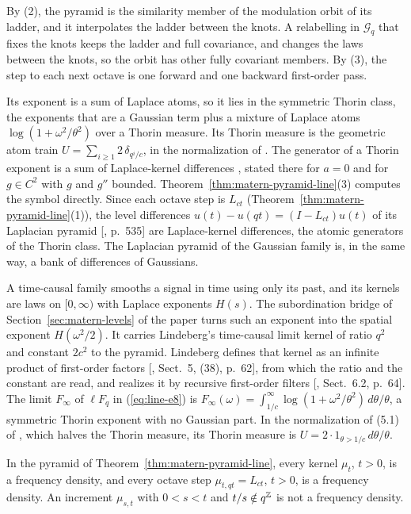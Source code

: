 By (2), the \Matern{} pyramid is the similarity member of the modulation orbit of its ladder, and
it interpolates the ladder between the knots. A relabelling in $\mathcal{G}_q$ that fixes the knots
keeps the ladder and full covariance, and changes the laws between the knots, so the orbit has other
fully covariant members. By (3), the step to each next octave is
one forward and one backward first-order pass.

Its exponent is a sum of Laplace atoms, so it lies in the symmetric Thorin class, the exponents that
are a Gaussian term plus a mixture of Laplace atoms $\log(1 + \omega^2/\theta^2)$ over a Thorin
measure. Its Thorin measure is the geometric atom train $U = \sum_{i \ge 1}2\,\delta_{q^i/c}$, in the
normalization of . The generator of a Thorin exponent is
a sum of Laplace-kernel differences , stated there for $a = 0$ and
for $g \in C^2$ with $g$ and $g''$ bounded. Theorem~\ref{thm:matern-pyramid-line}(3) computes the
symbol directly. Since each octave step is $L_{ct}$ (Theorem~\ref{thm:matern-pyramid-line}(1)), the
level differences $u(t) - u(qt) = (I - L_{ct})u(t)$ of its Laplacian pyramid [, p.~535] are
Laplace-kernel differences, the atomic generators of the Thorin class. The Laplacian pyramid of the
Gaussian family is, in the same way, a bank of differences of Gaussians.

A time-causal family smooths a signal in time using only its past, and its kernels are laws on
$[0,\infty)$ with Laplace exponents $H(s)$. The subordination bridge of Section~\ref{sec:matern-levels}
of the paper turns such an exponent into the spatial exponent $H(\omega^2/2)$. It carries Lindeberg's time-causal
limit kernel of ratio $q^2$ and constant $2c^2$ to the \Matern{} pyramid. Lindeberg defines that
kernel as an infinite product of first-order factors
[, Sect.~5, (38), p.~62], from which the ratio and the constant are read,
and realizes it by recursive first-order filters [, Sect.~6.2, p.~64].
The limit $F_\infty$ of $\ell F_q$ in (\ref{eq:line-e8}) is
$F_\infty(\omega) = \int_{1/c}^\infty\log(1 + \omega^2/\theta^2)\,d\theta/\theta$, a symmetric
Thorin exponent with no Gaussian part. In the normalization of (5.1) of
, which halves the Thorin measure, its Thorin measure is
$U = 2\cdot 1_{\theta > 1/c}\,d\theta/\theta$.

\begin{theorem}
\label{thm:matern-pyramid-line-noncreation}

In the \Matern{} pyramid of Theorem~\ref{thm:matern-pyramid-line}, every kernel $\mu_t$, $t > 0$, is
a \Polya{} frequency density, and every octave step $\mu_{t,qt} = L_{ct}$, $t > 0$, is a \Polya{}
frequency density.
An increment $\mu_{s,t}$ with $0 < s < t$ and $t/s \notin q^{\mathbb{Z}}$ is not a \Polya{}
frequency density.
\end{theorem}

